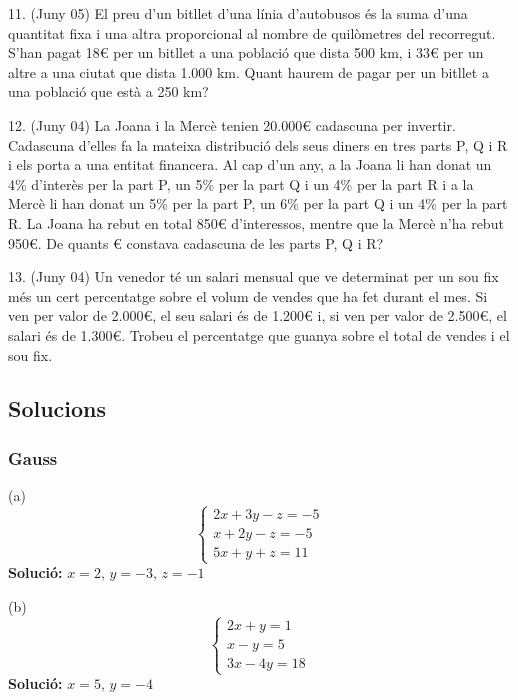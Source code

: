 \documentclass[12pt]{article}
\begin{document}
\begin{exercici}
11. (Juny 05) El preu d’un bitllet d’una línia d’autobusos és la suma d’una quantitat fixa i una altra proporcional al nombre de quilòmetres del recorregut. S’han pagat 18€ per un bitllet a una població que dista 500 km, i 33€ per un altre a una ciutat que dista 1.000 km. Quant haurem de pagar per un bitllet a una població que està a 250 km?
\end{exercici}

\begin{exercici}
12. (Juny 04) La Joana i la Mercè tenien 20.000€ cadascuna per invertir. Cadascuna d’elles fa la mateixa distribució dels seus diners en tres parts P, Q i R i els porta a una entitat financera. Al cap d’un any, a la Joana li han donat un 4\% d’interès per la part P, un 5\% per la part Q i un 4\% per la part R i a la Mercè li han donat un 5\% per la part P, un 6\% per la part Q i un 4\% per la part R. La Joana ha rebut en total 850€ d’interessos, mentre que la Mercè n’ha rebut 950€. De quants € constava cadascuna de les parts P, Q i R?
\end{exercici}

\begin{exercici}
13. (Juny 04) Un venedor té un salari mensual que ve determinat per un sou fix més un cert percentatge sobre el volum de vendes que ha fet durant el mes. Si ven per valor de 2.000€, el seu salari és de 1.200€ i, si ven per valor de 2.500€, el salari és de 1.300€. Trobeu el percentatge que guanya sobre el total de vendes i el sou fix.
\end{exercici}

\subsection{Solucions}

\subsubsection*{Gauss}

\begin{exercici}
(a)
\[
\begin{cases}
2x + 3y - z = -5 \\
x + 2y - z = -5 \\
5x + y + z = 11
\end{cases}
\]
\textbf{Solució:} \( x = 2, \, y = -3, \, z = -1 \)
\end{exercici}

\begin{exercici}
(b)
\[
\begin{cases}
2x + y = 1 \\
x - y = 5 \\
3x - 4y = 18
\end{cases}
\]
\textbf{Solució:} \( x = 5, \, y = -4 \)
\end{exercici}
\end{document}
